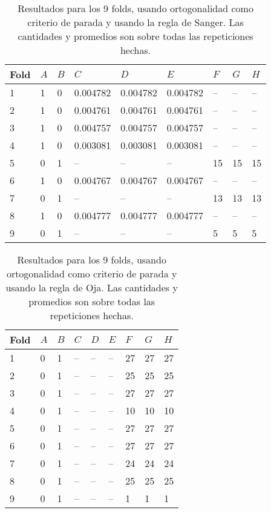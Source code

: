 \documentclass[informe.tex]{subfiles}
\begin{document}
      
      \begin{table}[h]
	\centering
	\begin{tabular}{|l|l|l|l|l|l|l|l|l|} \hline
	Fold & $A$ & $B$ & $C$ & $D$ & $E$ & $F$ & $G$ & $H$ \\ \hline
	1& 1 & 0 & 0.004782 & 0.004782 & 0.004782 & -- & -- & -- \\ \hline
	2& 1 & 0 & 0.004761 & 0.004761 & 0.004761 & -- & -- & -- \\ \hline
	3& 1 & 0 & 0.004757 & 0.004757 & 0.004757 & -- & -- & -- \\ \hline
	4& 1 & 0 & 0.003081 & 0.003081 & 0.003081 & -- & -- & -- \\ \hline
	5& 0 & 1 & -- & -- & -- & 15 & 15 & 15 \\ \hline
	6& 1 & 0 & 0.004767 & 0.004767 & 0.004767 & -- & -- & -- \\ \hline
	7& 0 & 1 & -- & -- & -- & 13 & 13 & 13 \\ \hline
	8& 1 & 0 & 0.004777 & 0.004777 & 0.004777 & -- & -- & -- \\ \hline
	9& 0 & 1 & -- & -- & -- & 5 & 5 & 5 \\ \hline
	\end{tabular}
	\caption{Resultados para los 9 folds, usando ortogonalidad como criterio de parada y usando la regla de Sanger. Las cantidades y promedios son sobre todas las repeticiones hechas.}
	\label{tab:ortogonalidad_sanger}
      \end{table}

      
      \begin{table}[h]
	\centering
	\begin{tabular}{|l|l|l|l|l|l|l|l|l|} \hline
	Fold & $A$ & $B$ & $C$ & $D$ & $E$ & $F$ & $G$ & $H$ \\ \hline
	1& 0 & 1 & -- & -- & -- & 27 & 27 & 27 \\ \hline
	2& 0 & 1 & -- & -- & -- & 25 & 25 & 25 \\ \hline
	3& 0 & 1 & -- & -- & -- & 27 & 27 & 27 \\ \hline
	4& 0 & 1 & -- & -- & -- & 10 & 10 & 10 \\ \hline
	5& 0 & 1 & -- & -- & -- & 27 & 27 & 27 \\ \hline
	6& 0 & 1 & -- & -- & -- & 27 & 27 & 27 \\ \hline
	7& 0 & 1 & -- & -- & -- & 24 & 24 & 24 \\ \hline
	8& 0 & 1 & -- & -- & -- & 25 & 25 & 25 \\ \hline
	9& 0 & 1 & -- & -- & -- & 1 & 1 & 1 \\ \hline
	\end{tabular}
	\caption{Resultados para los 9 folds, usando ortogonalidad como criterio de parada y usando la regla de Oja. Las cantidades y promedios son sobre todas las repeticiones hechas.}
	\label{tab:ortogonalidad_oja}
      \end{table}
\end{document}
